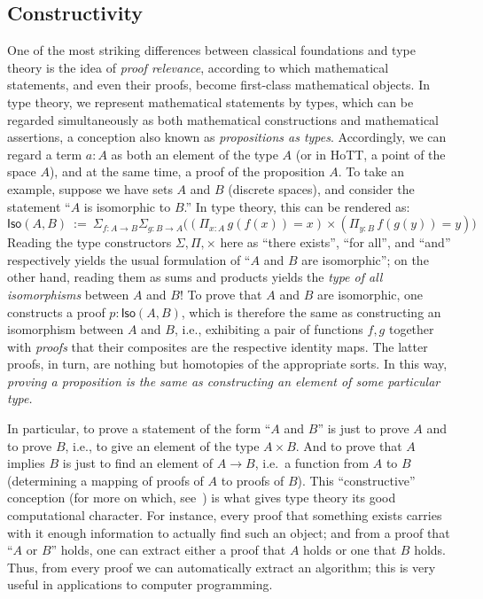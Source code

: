 

\subsection*{Constructivity} 


One of the most striking differences between classical foundations and type theory is the idea of \emph{proof relevance}, according to which mathematical statements, and even their proofs, become first-class mathematical objects.
In type theory, we represent mathematical statements by types, which can be regarded simultaneously as both mathematical constructions and mathematical assertions, a conception also known as \emph{propositions as types}.
Accordingly, we can regard a term $a : A$ as both an element of the type $A$ (or in HoTT, a point of the space $A$), and at the same time, a proof of the proposition $A$.
To take an example, suppose we have sets $A$ and $B$ (discrete spaces), and consider the statement ``$A$ is isomorphic to $B$.''
In type theory, this can be rendered as:
\[
\mathsf{Iso}(A,B)\ :=\ \Sigma_{f : A\to B}\Sigma_{g : B\to A}\big((\Pi_{x:A}\, g(f(x)) = x) \times (\Pi_{y:B}\, f(g(y)) = y)\big)
\]
%
Reading the type constructors $\Sigma, \Pi, \times$  here  as ``there exists'', ``for all'', and ``and'' respectively yields the usual formulation of ``$A$ and $B$ are isomorphic''; on the other hand, reading them as sums and products yields the \emph{type of all isomorphisms} between $A$ and $B$!  To prove that $A$ and $B$ are isomorphic, one  constructs a proof $p : \mathsf{Iso}(A,B)$, which is therefore the same  as constructing an isomorphism between $A$ and $B$, i.e., exhibiting a pair of functions $f, g$ together with \emph{proofs} that their composites are the respective identity maps.  The latter proofs, in turn, are nothing but homotopies of the appropriate sorts.  In this way, \emph{proving a proposition is the same as constructing an element of some particular type.}

In particular, to prove a statement of the form ``$A$ and $B$'' is just to prove $A$ and to prove $B$, i.e., to give an element of the type $A\times B$.
And to prove that $A$ implies $B$ is just to find an element of $A\to B$, i.e.\ a function from $A$ to $B$ (determining a mapping of proofs of $A$ to proofs of $B$).
This ``constructive'' conception (for more on which, see~\cite{kolmogorov,BHK}) is what gives type theory its good computational character.
For instance, every proof that something exists carries with it enough information to actually find such an object; and from a proof that  ``$A$ or $B$'' holds, one can extract either a proof that $A$ holds or one that $B$ holds.
Thus, from every proof we can automatically extract an algorithm; this is very useful in applications to computer programming.


